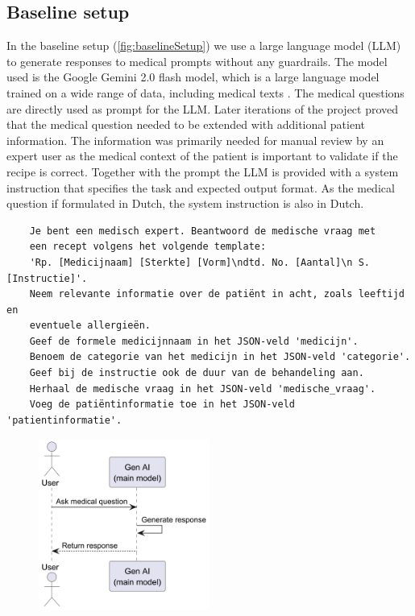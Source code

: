 \subsection{Baseline setup}
In the baseline setup (\autoref{fig:baselineSetup}) we use a large language model (LLM) to generate responses to medical prompts without any guardrails.
The model used is the Google Gemini 2.0 flash model, which is a large language model trained on a wide range of data, including medical texts \citep{saab2024capabilities}.
The medical questions are directly used as prompt for the LLM.
Later iterations of the project proved that the medical question needed to be extended with additional patient information.
The information was primarily needed for manual review by an expert user as the medical context of the patient is important to validate if the recipe is correct.
Together with the prompt the LLM is provided with a system instruction that specifies the task and expected output format.
As the medical question if formulated in Dutch, the system instruction is also in Dutch.
\begin{verbatim}
    Je bent een medisch expert. Beantwoord de medische vraag met
    een recept volgens het volgende template:
    'Rp. [Medicijnaam] [Sterkte] [Vorm]\ndtd. No. [Aantal]\n S. [Instructie]'.
    Neem relevante informatie over de patiënt in acht, zoals leeftijd en
    eventuele allergieën.
    Geef de formele medicijnnaam in het JSON-veld 'medicijn'.
    Benoem de categorie van het medicijn in het JSON-veld 'categorie'.
    Geef bij de instructie ook de duur van de behandeling aan.
    Herhaal de medische vraag in het JSON-veld 'medische_vraag'.
    Voeg de patiëntinformatie toe in het JSON-veld 'patientinformatie'.
\end{verbatim}

\begin{figure}[H]
    \includegraphics[width=0.5\textwidth]{figures/baselineSetupSequenceDiagram.png}
    \label{fig:baselineSetup}
\end{figure}

